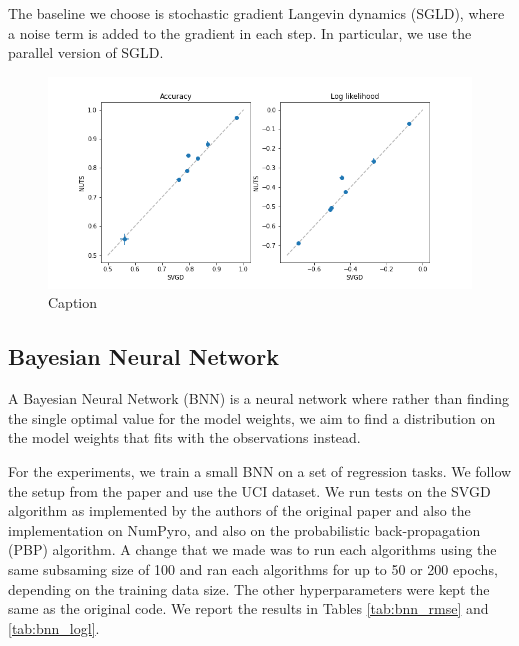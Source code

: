 The baseline we choose is stochastic gradient Langevin dynamics (SGLD), where a noise term is added to the gradient in each step. In particular, we use the parallel version of SGLD. 



\begin{figure}[h]
    \centering
    \includegraphics[width=\textwidth]{figs/logistic_svgd_nuts.png}
    \caption{Caption}
    \label{fig:logist_small}
\end{figure}

\subsection{Bayesian Neural Network}

A Bayesian Neural Network (BNN) is a neural network where rather than finding the single optimal value for the model weights, we aim to find a distribution on the model weights that fits with the observations instead.

For the experiments, we train a small BNN on a set of regression tasks. We follow the setup from the paper and use the UCI dataset. We run tests on the SVGD algorithm as implemented by the authors of the original paper and also the implementation on NumPyro, and also on the probabilistic back-propagation (PBP) algorithm. A change that we made was to run each algorithms using the same subsaming size of 100 and ran each algorithms for up to 50 or 200 epochs, depending on the training data size. The other hyperparameters were kept the same as the original code. We report the results in Tables \ref{tab:bnn_rmse} and \ref{tab:bnn_logl}. 

